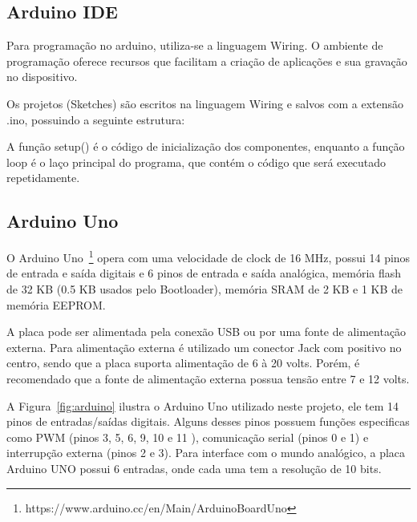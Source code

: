 \subsection{Arduino IDE}

Para programação no arduino, utiliza-se a linguagem Wiring. O ambiente de programação oferece recursos que facilitam a criação de aplicações e sua gravação no dispositivo.

Os projetos (Sketches) são escritos na linguagem Wiring e salvos com a extensão .ino, possuindo a seguinte estrutura:



A função setup() é o código de inicialização dos componentes, enquanto a função loop é o laço principal do programa, que contém o código que será executado repetidamente.

\subsection{Arduino Uno}

O Arduino Uno~\footnote{https://www.arduino.cc/en/Main/ArduinoBoardUno} opera com uma velocidade de clock de 16 MHz, possui 14 pinos de entrada e saída digitais e 6 pinos de entrada e saída analógica, memória flash de 32 KB (0.5 KB usados pelo Bootloader), memória SRAM de 2 KB e 1 KB de memória EEPROM. 

A placa pode ser alimentada pela conexão USB ou por uma fonte de alimentação externa. Para alimentação externa é utilizado um conector Jack com positivo no centro, sendo que a placa suporta alimentação de 6 à 20 volts. Porém, é recomendado que a fonte de alimentação externa possua tensão entre 7 e 12 volts. 

A Figura~\ref{fig:arduino} ilustra o Arduino Uno utilizado neste projeto, ele tem 14 pinos de entradas/saídas digitais. Alguns desses pinos possuem funções especificas como PWM (pinos 3, 5, 6, 9, 10 e 11 ), comunicação serial (pinos 0 e 1) e interrupção externa (pinos 2 e 3).
Para interface com o mundo analógico, a placa Arduino UNO possui 6 entradas, onde cada uma tem a resolução de 10 bits.

